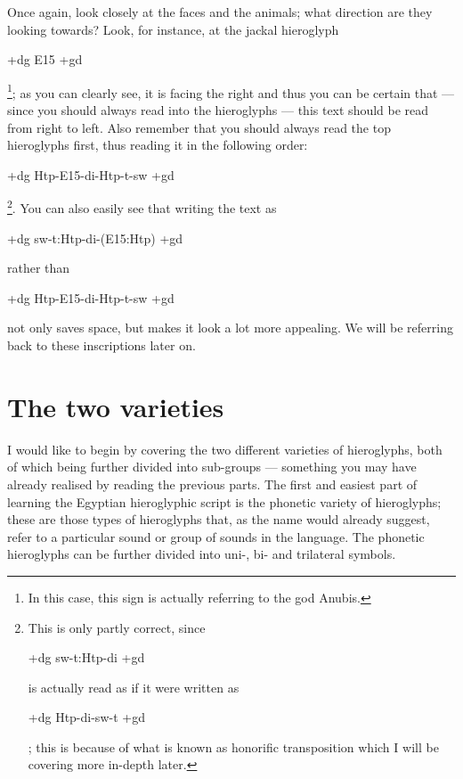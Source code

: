 \documentclass[a5paper,twoside,11pt]{report}
\begin{document}
		Once again, look closely at the faces and the animals; what direction are they looking towards? Look, for instance, at the jackal hieroglyph \begin{hieroglyph}+dg E15 +gd\end{hieroglyph}\footnote{In this case, this sign is actually referring to the god Anubis.}; as you can clearly see, it is facing the right and thus you can be certain that — since you should always read into the hieroglyphs — this text should be read from right to left. Also remember that you should always read the top hieroglyphs first, thus reading it in the following order: \begin{hieroglyph}+dg Htp-E15-di-Htp-t-sw +gd\end{hieroglyph}\footnote{This is only partly correct, since \begin{hieroglyph}+dg sw-t:Htp-di +gd\end{hieroglyph} is actually read as if it were written as \begin{hieroglyph}+dg Htp-di-sw-t +gd\end{hieroglyph}; this is because of what is known as honorific transposition which I will be covering more in-depth later.}. You can also easily see that writing the text as \begin{hieroglyph}+dg sw-t:Htp-di-(E15:\!\!\!\!Htp) +gd\end{hieroglyph} rather than \begin{hieroglyph}+dg Htp-E15-di-Htp-t-sw +gd\end{hieroglyph} not only saves space, but makes it look a lot more appealing.
		We will be referring back to these inscriptions later on.

\chapter*{The two varieties}

		I would like to begin by covering the two different varieties of hieroglyphs, both of which being further divided into sub-groups — something you may have already realised by reading the previous parts. The first and easiest part of learning the Egyptian hieroglyphic script is the phonetic variety of hieroglyphs; these are those types of hieroglyphs that, as the name would already suggest, refer to a particular sound or group of sounds in the language. The phonetic hieroglyphs can be further divided into uni-, bi- and trilateral symbols.
\end{document}
